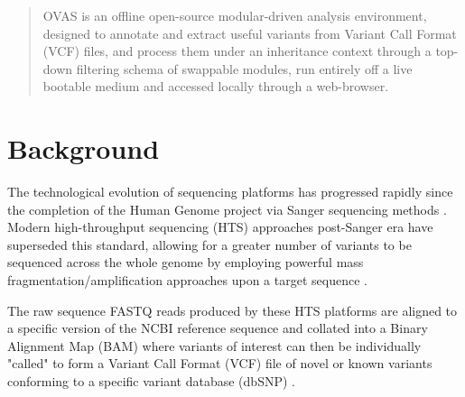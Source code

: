 \documentclass[twocolumn]{bmcart}%
\def\app{OVAS}
\begin{document}
\begin{frontmatter}
\begin{fmbox}
\begin{abstractbox}
\begin{abstract}
\app{} is an offline open-source modular-driven analysis environment, designed to annotate and extract useful variants from Variant Call Format (VCF) files, and process them under an inheritance context through a top-down filtering schema of swappable modules, run entirely off a live bootable medium and accessed locally through a web-browser.

\end{abstract}

\begin{keyword}
\end{keyword}


\end{abstractbox}
%
\end{fmbox}%

\end{frontmatter}


\section*{Background}
The technological evolution of sequencing platforms has progressed rapidly since the completion of the Human Genome project via Sanger sequencing methods \cite{lander2001initial,sanger1977dna}. Modern high-throughput sequencing (HTS) approaches post-Sanger era have superseded this standard, allowing for a greater number of variants to be sequenced across the whole genome by employing powerful mass fragmentation/amplification approaches upon a target sequence \cite{lengauer2007bioinformatics,bockenhauer2012genetic}.


The raw sequence FASTQ reads produced by these HTS platforms are aligned to a specific version of the NCBI reference sequence and collated into a Binary Alignment Map (BAM) where variants of interest can then be individually "called" to form a Variant Call Format (VCF) file of novel or known variants conforming to a specific variant database (dbSNP) \cite{li2009sequence,danecek2011variant}.
\end{document}
